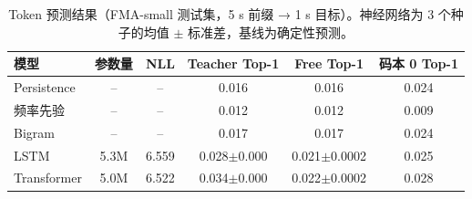 \begin{table}[H]
\centering\small
\caption{Token 预测结果（FMA-small 测试集，5 s 前缀 → 1 s 目标）。神经网络为 3 个种子的均值 $\pm$ 标准差，基线为确定性预测。}
\label{tab:token}
\begin{tabular}{lccccc}
\toprule
模型 & 参数量 & NLL & Teacher Top-1 & Free Top-1 & 码本 0 Top-1\\
\midrule
Persistence & -- & -- & 0.016 & 0.016 & 0.024\\
频率先验 & -- & -- & 0.012 & 0.012 & 0.009\\
Bigram & -- & -- & 0.017 & 0.017 & 0.024\\
LSTM & 5.3M & 6.559 & 0.028$\pm$0.000 & 0.021$\pm$0.0002 & 0.025\\
Transformer & 5.0M & 6.522 & 0.034$\pm$0.000 & 0.022$\pm$0.0002 & 0.028\\
\bottomrule
\end{tabular}
\end{table}
